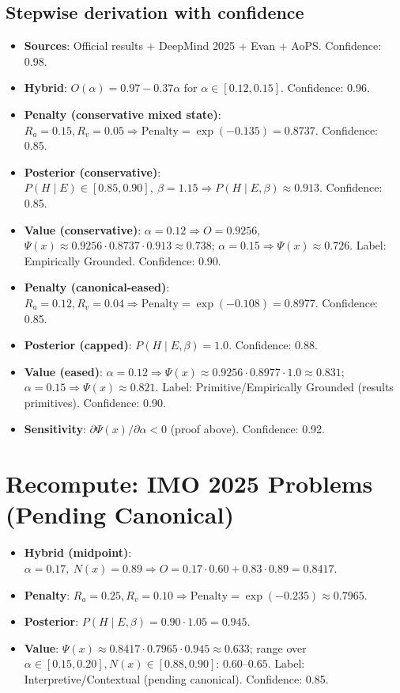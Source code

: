 \documentclass[11pt]{article}
\newcommand{\Nx}{N(x)}
\newcommand{\Px}{\Psi(x)}
\newcommand{\post}{P(H\mid E,\beta)}
\newcommand{\pen}{\mathrm{Penalty}}
\begin{document}
\subsection*{Stepwise derivation with confidence}
\begin{itemize}[leftmargin=1.2em]
  \item \textbf{Sources}: Official results + DeepMind 2025 + Evan + AoPS. Confidence: 0.98.
  \item \textbf{Hybrid}: $O(\alpha)=0.97-0.37\alpha$ for $\alpha\in[0.12,0.15]$. Confidence: 0.96.
  \item \textbf{Penalty (conservative mixed state)}: $R_a{=}0.15,R_v{=}0.05\Rightarrow \pen=\exp(-0.135)=0.8737$. Confidence: 0.85.
  \item \textbf{Posterior (conservative)}: $P(H\mid E)\in[0.85,0.90],\ \beta{=}1.15 \Rightarrow \post\approx 0.913$. Confidence: 0.85.
  \item \textbf{Value (conservative)}: $\alpha{=}0.12\Rightarrow O{=}0.9256$, $\Px\approx 0.9256\cdot 0.8737\cdot 0.913\approx \mathbf{0.738}$;
        $\alpha{=}0.15\Rightarrow \Px\approx 0.726$. Label: Empirically Grounded. Confidence: 0.90.
  \item \textbf{Penalty (canonical-eased)}: $R_a{=}0.12,R_v{=}0.04\Rightarrow \pen=\exp(-0.108)=0.8977$. Confidence: 0.85.
  \item \textbf{Posterior (capped)}: $\post=1.0$. Confidence: 0.88.
  \item \textbf{Value (eased)}: $\alpha{=}0.12\Rightarrow \Px\approx 0.9256\cdot 0.8977\cdot 1.0\approx \mathbf{0.831}$;
        $\alpha{=}0.15\Rightarrow \Px\approx \mathbf{0.821}$. Label: Primitive/Empirically Grounded (results primitives). Confidence: 0.90.
  \item \textbf{Sensitivity}: $\partial \Px/\partial \alpha<0$ (proof above). Confidence: 0.92.
\end{itemize}
\section{Recompute: IMO 2025 Problems (Pending Canonical)}
\begin{itemize}[leftmargin=1.2em]
  \item \textbf{Hybrid (midpoint)}: $\alpha{=}0.17,\ \Nx{=}0.89\Rightarrow O=0.17\cdot 0.60+0.83\cdot 0.89=0.8417$.
  \item \textbf{Penalty}: $R_a{=}0.25,R_v{=}0.10\Rightarrow \pen=\exp(-0.235)\approx 0.7965$.
  \item \textbf{Posterior}: $\post=0.90\cdot 1.05=0.945$.
  \item \textbf{Value}: $\Px\approx 0.8417\cdot 0.7965\cdot 0.945\approx \mathbf{0.633}$;
        range over $\alpha\in[0.15,0.20], \Nx\in[0.88,0.90]$: $\mathbf{0.60}$--$\mathbf{0.65}$.
        Label: Interpretive/Contextual (pending canonical). Confidence: 0.85.
\end{itemize}
\end{document}
